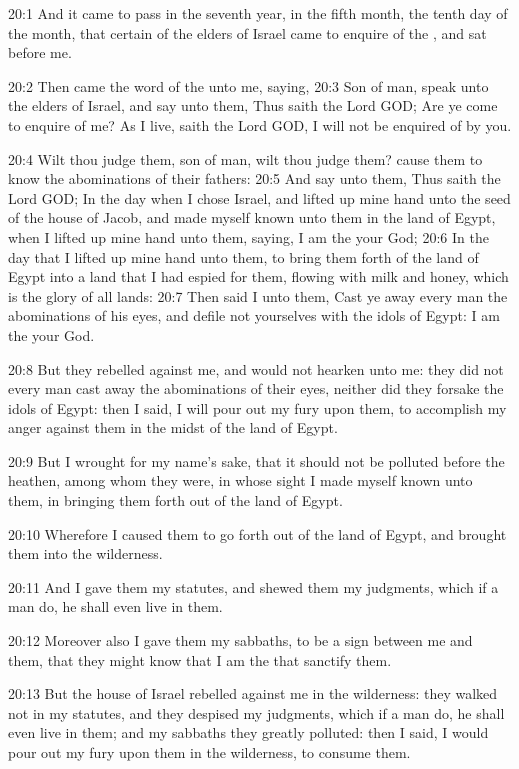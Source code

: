20:1 And it came to pass in the seventh year, in the fifth month, the
tenth day of the month, that certain of the elders of Israel came to
enquire of the \LORD, and sat before me.

20:2 Then came the word of the \LORD unto me, saying, 20:3 Son of man,
speak unto the elders of Israel, and say unto them, Thus saith the
Lord GOD; Are ye come to enquire of me? As I live, saith the Lord GOD,
I will not be enquired of by you.

20:4 Wilt thou judge them, son of man, wilt thou judge them? cause
them to know the abominations of their fathers: 20:5 And say unto
them, Thus saith the Lord GOD; In the day when I chose Israel, and
lifted up mine hand unto the seed of the house of Jacob, and made
myself known unto them in the land of Egypt, when I lifted up mine
hand unto them, saying, I am the \LORD your God; 20:6 In the day that I
lifted up mine hand unto them, to bring them forth of the land of
Egypt into a land that I had espied for them, flowing with milk and
honey, which is the glory of all lands: 20:7 Then said I unto them,
Cast ye away every man the abominations of his eyes, and defile not
yourselves with the idols of Egypt: I am the \LORD your God.

20:8 But they rebelled against me, and would not hearken unto me: they
did not every man cast away the abominations of their eyes, neither
did they forsake the idols of Egypt: then I said, I will pour out my
fury upon them, to accomplish my anger against them in the midst of
the land of Egypt.

20:9 But I wrought for my name's sake, that it should not be polluted
before the heathen, among whom they were, in whose sight I made myself
known unto them, in bringing them forth out of the land of Egypt.

20:10 Wherefore I caused them to go forth out of the land of Egypt,
and brought them into the wilderness.

20:11 And I gave them my statutes, and shewed them my judgments, which
if a man do, he shall even live in them.

20:12 Moreover also I gave them my sabbaths, to be a sign between me
and them, that they might know that I am the \LORD that sanctify them.

20:13 But the house of Israel rebelled against me in the wilderness:
they walked not in my statutes, and they despised my judgments, which
if a man do, he shall even live in them; and my sabbaths they greatly
polluted: then I said, I would pour out my fury upon them in the
wilderness, to consume them.

